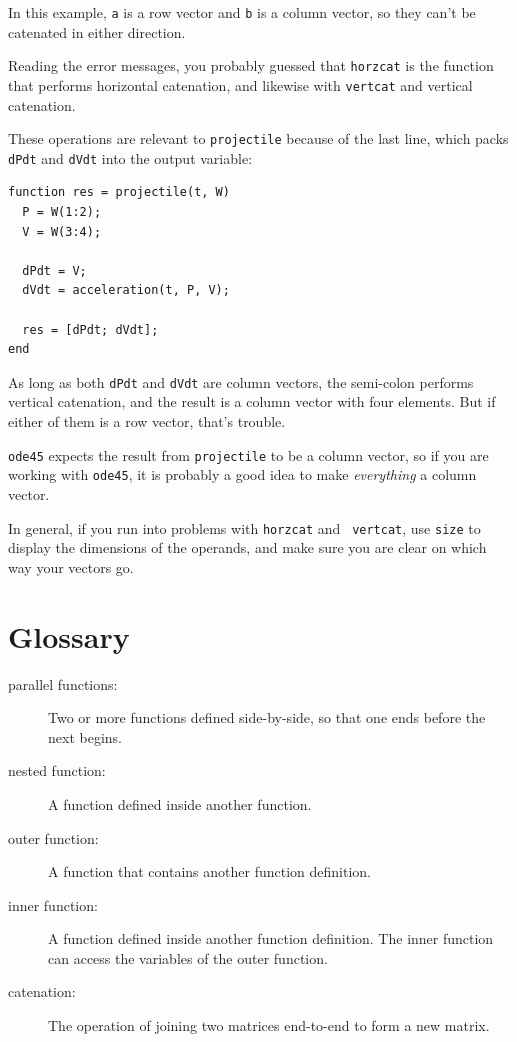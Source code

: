 \documentclass{book}
\begin{document}
In this example, {\tt a} is a row vector and {\tt b} is a column
vector, so they can't be catenated in either direction.

Reading the error messages, you probably guessed that {\tt horzcat}
is the function that performs horizontal catenation, and likewise
with {\tt vertcat} and vertical catenation.

These operations are relevant to {\tt projectile} because of the
last line, which packs {\tt dPdt} and {\tt dVdt} into the
output variable:

\begin{verbatim}
function res = projectile(t, W)
  P = W(1:2);
  V = W(3:4);

  dPdt = V;             
  dVdt = acceleration(t, P, V);

  res = [dPdt; dVdt];
end
\end{verbatim}

As long as both {\tt dPdt} and {\tt dVdt} are column vectors,
the semi-colon performs vertical catenation, and the result is
a column vector with four elements. But if either of them is a
row vector, that's trouble.

{\tt ode45} expects the result from {\tt projectile} to be a
column vector, so if you are working with {\tt ode45}, it is
probably a good idea to make {\em everything} a column vector.

In general, if you run into problems with {\tt horzcat} and {\tt
vertcat}, use {\tt size} to display the dimensions of the operands,
and make sure you are clear on which way your vectors go.


\section{Glossary}

\begin{description}

\item[parallel functions:] Two or more functions defined side-by-side,
so that one ends before the next begins.

\item[nested function:] A function defined inside another function.

\item[outer function:] A function that contains another function
definition.

\item[inner function:] A function defined inside another function
definition. The inner function can access the variables of the
outer function.

\item[catenation:] The operation of joining two matrices end-to-end to
form a new matrix.


\end{description}
\end{document}

